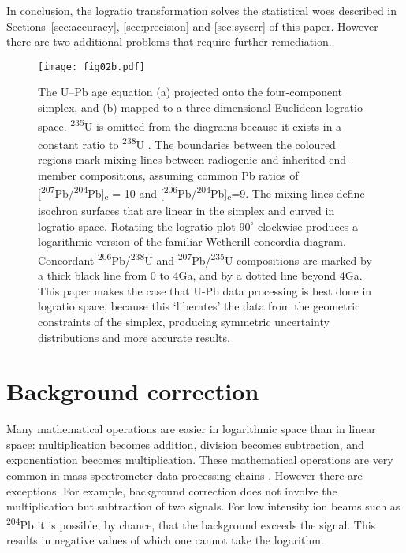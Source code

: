 \documentclass{article}
\begin{document}
In conclusion, the logratio transformation solves the statistical woes
described in Sections~\ref{sec:accuracy}, \ref{sec:precision} and
\ref{sec:syserr} of this paper.  However there are two additional
problems that require further remediation.

\begin{figure}[!ht]
  \centering
  \texttt{[image: fig02b.pdf]}
  \caption{The U--Pb age equation (a) projected onto the
    four-component simplex, and (b) mapped to a three-dimensional
    Euclidean logratio space. \textsuperscript{235}U is omitted from
    the diagrams because it exists in a constant ratio to
    \textsuperscript{238}U
    \citep[\textsuperscript{238}U/\textsuperscript{235}U=137.818,][]{hiess2012}. The
    boundaries between the coloured regions mark mixing lines between
    radiogenic and inherited end-member compositions, assuming common
    Pb ratios of
    [\textsuperscript{207}Pb/\textsuperscript{204}Pb]\textsubscript{c}
    = 10 and
    [\textsuperscript{206}Pb/\textsuperscript{204}Pb]\textsubscript{c}=9. The
    mixing lines define isochron surfaces that are linear in the
    simplex and curved in logratio space. Rotating the logratio plot
    $90^\circ$ clockwise produces a logarithmic version of the
    familiar Wetherill concordia diagram. Concordant
    \textsuperscript{206}Pb/\textsuperscript{238}U and
    \textsuperscript{207}Pb/\textsuperscript{235}U compositions are
    marked by a thick black line from 0 to 4Ga, and by a dotted line
    beyond 4Ga. This paper makes the case that U-Pb data processing is
    best done in logratio space, because this `liberates' the data
    from the geometric constraints of the simplex, producing symmetric
    uncertainty distributions and more accurate results.}
  \label{fig:ternaryUPb}
\end{figure}

\section{Background correction}
\label{sec:blanks}

Many mathematical operations are easier in logarithmic space than in
linear space: multiplication becomes addition, division becomes
subtraction, and exponentiation becomes multiplication. These
mathematical operations are very common in mass spectrometer data
processing chains \citep{vermeesch2015b}. However there are
exceptions. For example, background correction does not involve the
multiplication but subtraction of two signals. For low intensity ion
beams such as \textsuperscript{204}Pb it is possible, by chance, that
the background exceeds the signal.  This results in negative values of
which one cannot take the logarithm.\medskip
\end{document}
